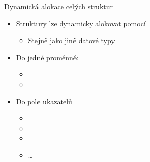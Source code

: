 \begin{frame}{Dynamická alokace celých struktur}

  \begin{itemize}
    \item Struktury lze dynamicky alokovat pomocí 
    \begin{itemize}
      \item Stejně jako jiné datové typy
    \end{itemize}

    \pause

    \item Do jedné proměnné:
    \begin{itemize}
      \item {}
      \item {}
    \end{itemize}

    \pause

    \item Do pole ukazatelů
    \begin{itemize}
      \item {}
      \item {}
      \item {}
      \item \dots
    \end{itemize}

  \end{itemize}

\end{frame}

